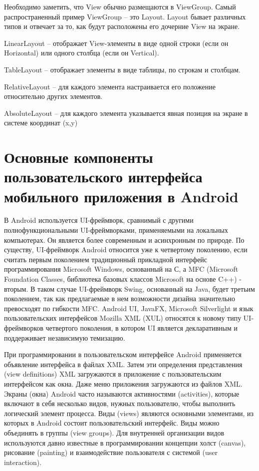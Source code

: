 Необходимо заметить, что View обычно размещаются в ViewGroup. Самый распространенный пример ViewGroup – это Layout. Layout бывает различных типов и отвечает за то, как будут расположены его дочерние View на экране.

LinearLayout – отображает View-элементы в виде одной строки (если он Horizontal) или одного столбца (если он Vertical).

TableLayout – отображает элементы в виде таблицы, по строкам и столбцам.

RelativeLayout – для каждого элемента настраивается его положение относительно других элементов.

AbsoluteLayout – для каждого элемента указывается явная позиция на экране в системе координат (x,y)

\section{Основные компоненты пользовательского интерфейса мобильного приложения в Android}

В Android используется UI-фреймворк, сравнимый с другими полнофункциональными UI-фреймворками, применяемыми на локальных компьютерах. Он является более современным и асинхронным по природе. По существу, UI-фреймворк Android относится уже к четвертому поколению, если считать первым поколением традиционный прикладной интерфейс программирования Microsoft Windows, основанный на С, а MFC (Microsoft Foundation Classes, библиотека базовых классов Microsoft на основе C++) - вторым. В таком случае UI-фреймворк Swing, основанный на Java, будет третьим поколением, так как предлагаемые в нем возможности дизайна значительно превосходят по гибкости MFC. Android UI, JavaFX, Microsoft Silverlight и язык пользовательских интерфейсов Mozilla XML (XUL) относятся к новому типу UI-фреймворков четвертого поколения, в котором UI является декларативным и поддерживает независимую темизацию.

При программировании в пользовательском интерфейсе Android применяется объявление интерфейса в файлах XML. Затем эти определения представления (view definitions) XML загружаются в приложение с пользовательским интерфейсом как окна. Даже меню приложения загружаются из файлов XML. Экраны (окна) Android часто называются активностями (activities), которые включают в себя несколько видов, нужных пользователю, чтобы выполнить логический элемент процесса. Виды (views) являются основными элементами, из которых в Android состоит пользовательский интерфейс. Виды можно объединять в группы (view groups). Для внутренней организации видов используются давно известные в программировании концепции холст (canvas), рисование (painting) и взаимодействие пользователя с системой (user interaction).

